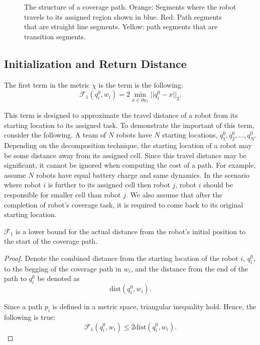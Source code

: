 \documentclass[../main.tex]{subfiles}
\begin{document}
\begin{figure}
	\centering
	
	\caption{The structure of a coverage path. Orange: Segments where the robot travels to its assigned region shown in blue. Red: Path segments that are straight line segments. Yellow: path segments that are transition segments.}
	\label{fig:path_parts}
\end{figure}


\subsection{Initialization and Return Distance}
\label{subsection:init_ret_distance}

The first term in the metric $\chi$ is the term is the following: 
\begin{equation}
	\mathcal{F}_1(q^0_i,w_i)=2\min_{x\in\partial w_i}||q^0_i-x||_2.
\end{equation}

This term is designed to approximate the travel distance of a robot from its starting location to its assigned task. To demonstrate the important of this term, consider the following. A team of $N$ robots have $N$ starting locations, $q^0_1,q^0_2,\ldots,q^0_N$. Depending on the decomposition technique, the starting location of a robot may be some distance away from its assigned cell. Since this travel distance may be significant, it cannot be ignored when computing the cost of a path. For example, assume $N$ robots have equal battery charge and same dynamics. In the scenario where robot $i$ is further to its assigned cell then robot $j$, robot $i$ should be responsible for smaller cell than robot $j$. We also assume that after the completion of robot's coverage task, it is required to come back to its original starting location.

\begin{proposition}
	$\mathcal{F}_1$ is a lower bound for the actual distance from the robot's initial position to the start of the coverage path.
\end{proposition}
\begin{proof}
	Denote the combined distance from the starting location of the robot $i$, $q^0_i$, to the begging of the coverage path in $w_i$, and the distance from the end of the path to $q^0_i$ be denoted as
	\begin{equation}
		\text{dist}(q^0_i,w_i).
	\end{equation}

	Since a path $p_i$ is defined in a metric space, triangular inequality hold. Hence, the following is true:
	\begin{equation}
		\mathcal{F}_1(q^0_i,w_i)\leq2\text{dist}(q^0_i,w_i).
	\end{equation}
\end{proof}
\end{document}
